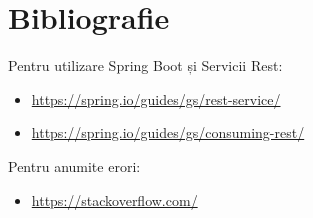 \documentclass[11pt,a4paper,twoside,notitlepage]{article}
\begin{document}
\section{Bibliografie}

Pentru utilizare Spring Boot și Servicii Rest:
\begin{itemize}
	\item \url{https://spring.io/guides/gs/rest-service/}  
	\item \url{https://spring.io/guides/gs/consuming-rest/}
\end{itemize}
Pentru anumite erori:
\begin{itemize}
	\item \url{https://stackoverflow.com/}	
\end{itemize}
\end{document}

